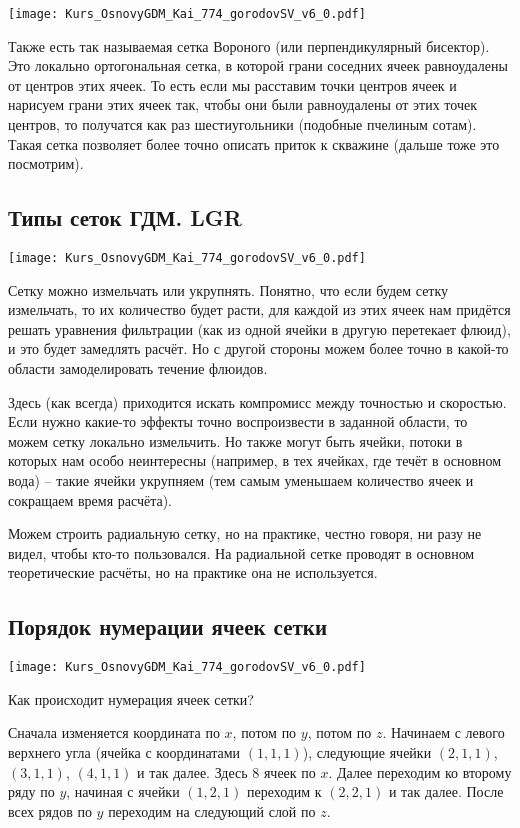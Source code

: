 \documentclass[main.tex]{subfiles}
\begin{document}
\texttt{[image: Kurs\_OsnovyGDM\_Kai\_774\_gorodovSV\_v6\_0.pdf]}

Также есть так называемая сетка Вороного (или перпендикулярный бисектор).
Это локально ортогональная сетка, в которой грани соседних ячеек равноудалены от центров этих ячеек.
То есть если мы расставим точки центров ячеек и нарисуем грани этих ячеек так, чтобы они были равноудалены от этих точек центров, то получатся как раз шестиугольники (подобные пчелиным сотам).
Такая сетка позволяет более точно описать приток к скважине (дальше тоже это посмотрим).

\subsection{Типы сеток ГДМ. LGR}

\texttt{[image: Kurs\_OsnovyGDM\_Kai\_774\_gorodovSV\_v6\_0.pdf]}

Сетку можно измельчать или укрупнять. Понятно, что если будем сетку измельчать, то их количество будет расти, для каждой из этих ячеек нам придётся решать уравнения фильтрации (как из одной ячейки в другую перетекает флюид), и это будет замедлять расчёт. Но с другой стороны можем более точно в какой-то области замоделировать течение флюидов.

Здесь (как всегда) приходится искать компромисс между точностью и скоростью.
Если нужно какие-то эффекты точно воспроизвести в заданной области, то можем сетку локально измельчить.
Но также могут быть ячейки, потоки в которых нам особо неинтересны (например, в тех ячейках, где течёт в основном вода) -- такие ячейки укрупняем (тем самым уменьшаем количество ячеек и сокращаем время расчёта).

Можем строить радиальную сетку, но на практике, честно говоря, ни разу не видел, чтобы кто-то пользовался.
На радиальной сетке проводят в основном теоретические расчёты, но на практике она не используется.

\subsection{Порядок нумерации ячеек сетки}

\texttt{[image: Kurs\_OsnovyGDM\_Kai\_774\_gorodovSV\_v6\_0.pdf]}

Как происходит нумерация ячеек сетки?

Сначала изменяется координата по $x$, потом по $y$, потом по $z$.
Начинаем с левого верхнего угла (ячейка с координатами $\left(1,1,1\right)$), следующие ячейки $\left(2,1,1\right)$, $\left(3,1,1\right)$, $\left(4,1,1\right)$ и так далее. Здесь 8 ячеек по $x$.
Далее переходим ко второму ряду по $y$, начиная с ячейки $\left(1,2,1\right)$ переходим к $\left(2,2,1\right)$ и так далее.
После всех рядов по $y$ переходим на следующий слой по $z$.
\end{document}
